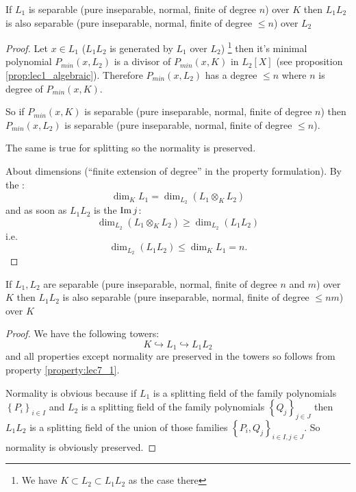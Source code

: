 \begin{property}
  If $L_1$ is separable (pure inseparable, normal, finite of
  degree $n$) over $K$ then $L_1 L_2$ is also separable (pure
  inseparable, normal, finite of degree $ \le n$) over $L_2$
  \begin{proof}
    Let $x \in L_1$ ($L_1 L_2$ is generated by $L_1$ over $L_2$)
    \footnote{
      We have $K \subset L_2 \subset L_1 L_2$ as the case there
    }
    then it's minimal polynomial $P_{min}\left(x, L_2\right)$ is a
    divisor of $P_{min}\left(x, K\right)$ in
    $L_2\left[X\right]$ (see proposition \ref{prop:lec1_algebraic}). 
    Therefore $P_{min}\left(x, L_2\right)$ has a
    degree $\le n$ where $n$ 
    is degree of $P_{min}\left(x, K\right)$.

    So if $P_{min}\left(x, K\right)$ is separable (pure inseparable,
    normal, finite of degree $n$)  then $P_{min}\left(x, L_2\right)$
    is separable (pure inseparable, normal, finite of degree $\le n$).

    The same is true for splitting so the normality is preserved.

    About dimensions (``finite extension of degree'' in the property
    formulation). By the :
    \[
    \dim_K L_1 = \dim_{L_2}\left(L_1 \otimes_K L_2\right)
    \]
    and as soon as $L_1 L_2$ is the $\operatorname{Im} j$:
    \[
    \dim_{L_2}\left(L_1 \otimes_K L_2\right) \ge
    \dim_{L_2}\left(L_1 L_2\right)
    \]
    i.e.
    \[
    \dim_{L_2}\left(L_1 L_2\right) \le \dim_K L_1 = n.
    \]
  \end{proof}
  \label{property:lec7_1}
\end{property}

\begin{property}
  If $L_1, L_2$ are separable (pure inseparable, normal, finite of
  degree $n$ and $m$) over $K$ then $L_1 L_2$ is also separable (pure
  inseparable, normal, finite of degree $ \le n m $) over $K$
  \begin{proof}
    We have the following towers:
    \[
    K \hookrightarrow L_1 \hookrightarrow L_1 L_2
    \]
    and all properties except normality are preserved in the towers so
    follows from property \ref{property:lec7_1}.

    Normality is obvious because if $L_1$ is a splitting field of the
    family polynomials $\left\{P_i\right\}_{i \in I}$
    and $L_2$ is a splitting field of the
    family polynomials $\left\{Q_j\right\}_{j \in J}$ then
    $L_1 L_2$ is a splitting field of the union of those families
    $\left\{P_i, Q_j\right\}_{i \in I, j \in J}$. So normality is
    obviously preserved.  
  \end{proof}
  \label{property:lec7_2}
\end{property}


